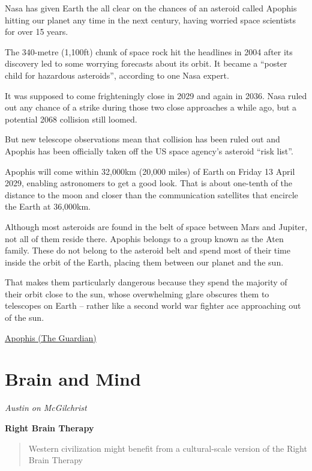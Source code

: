 \documentclass[
]{book}
\begin{document}
Nasa has given Earth the all clear on the chances of an asteroid called Apophis hitting our planet any time in the next century, having worried space scientists for over 15 years.

The 340-metre (1,100ft) chunk of space rock hit the headlines in 2004 after its discovery led to some worrying forecasts about its orbit. It became a ``poster child for hazardous asteroids'', according to one Nasa expert.

It was supposed to come frighteningly close in 2029 and again in 2036. Nasa ruled out any chance of a strike during those two close approaches a while ago, but a potential 2068 collision still loomed.

But new telescope observations mean that collision has been ruled out and Apophis has been officially taken off the US space agency's asteroid ``risk list''.

Apophis will come within 32,000km (20,000 miles) of
Earth on Friday 13 April 2029, enabling astronomers to get a good look. That is about one-tenth of the distance to the moon and closer than the communication satellites that encircle the Earth at 36,000km.

Although most asteroids are found in the belt of space between Mars and Jupiter, not all of them reside there. Apophis belongs to a group known as the Aten family. These do not belong to the asteroid belt and spend most of their time inside the orbit of the Earth, placing them between our planet and the sun.

That makes them particularly dangerous because they spend the majority of their orbit close to the sun, whose overwhelming glare obscures them to telescopes on Earth -- rather like a second world war fighter ace approaching out of the sun.

\href{https://www.theguardian.com/science/2021/mar/27/much-feared-asteroid-apophis-wont-hit-earth-for-at-least-100-years-nasa-says}{Apophis (The Guardian)}

\hypertarget{brain-and-mind}{%
\chapter{Brain and Mind}\label{brain-and-mind}}

\emph{Austin on McGilchrist}

\textbf{Right Brain Therapy}

\begin{quote}
Western civilization might benefit from a cultural-scale version of the Right Brain Therapy
\end{quote}
\end{document}
